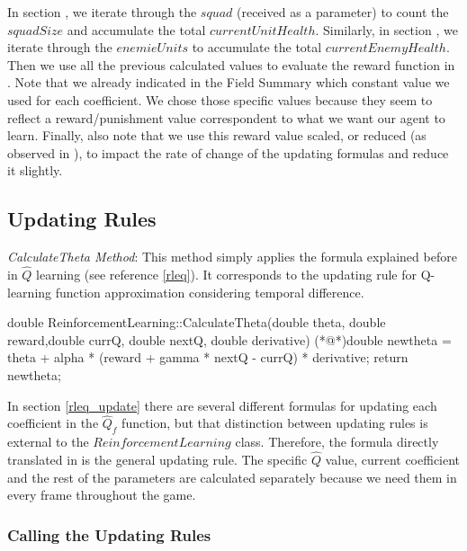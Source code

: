 In section , we iterate through the $squad$ (received as a parameter) to count the $squadSize$ and accumulate the total $currentUnitHealth$. Similarly, in section , we iterate through the $enemieUnits$ to accumulate the total $currentEnemyHealth$.\\

Then we use all the previous calculated values to evaluate the reward function in . Note that we already indicated in the Field Summary which constant value we used for each coefficient. We chose those specific values because they seem to reflect a reward/punishment value correspondent to what we want our agent to learn. Finally, also note that we use this reward value scaled, or reduced (as observed in ), to impact the rate of change of the updating formulas and reduce it slightly. \\

\subsection{Updating Rules}

\textit{CalculateTheta Method}: This method simply applies the formula explained before in $\hat{Q}$ learning (see reference \ref{rleq}). It corresponds to the updating rule for Q-learning function approximation considering temporal difference.\\

\begin{Sourcecode}[caption=CalculateTheta Method]
double ReinforcementLearning::CalculateTheta(double theta, double reward,double currQ, double nextQ, double derivative)
{
	(*@\lnote@*)double newtheta = theta + alpha * (reward + gamma * nextQ - currQ) * derivative;
	return newtheta;
}
\end{Sourcecode}

In section \ref{rleq_update} there are several different formulas for updating each coefficient in the $\hat{Q}_f$ function, but that distinction between updating rules is external to the $ReinforcementLearning$ class. Therefore, the formula directly translated in  is the general updating rule. The specific $\hat{Q}$ value, current coefficient and the rest of the parameters are calculated separately because we need them in every frame throughout the game. \\

\subsubsection{Calling the Updating Rules}

